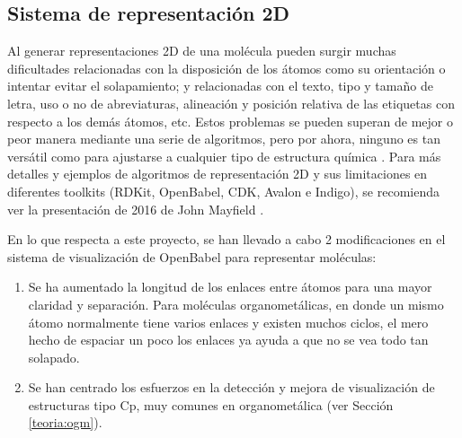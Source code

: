 \subsection{Sistema de representación 2D} \label{implementacion:dibujado}

Al generar representaciones 2D de una molécula pueden surgir muchas dificultades relacionadas con la disposición de los átomos como su orientación o intentar evitar el solapamiento; y relacionadas con el texto, tipo y tamaño de letra, uso o no de abreviaturas, alineación y posición relativa de las etiquetas con respecto a los demás átomos, etc. Estos problemas se pueden superan de mejor o peor manera mediante una serie de algoritmos, pero por ahora, ninguno es tan versátil como para ajustarse a cualquier tipo de estructura química \cite{david_molecular_2020}. Para más detalles y ejemplos de algoritmos de representación 2D y sus limitaciones en diferentes toolkits (RDKit, OpenBabel, CDK, Avalon e Indigo), se recomienda ver la presentación de 2016 de John Mayfield \cite{comparative_depictions}.

En lo que respecta a este proyecto, se han llevado a cabo 2 modificaciones en el sistema de visualización de OpenBabel para representar moléculas:
\begin{enumerate}
    \item Se ha aumentado la longitud de los enlaces entre átomos para una mayor claridad y separación. Para moléculas organometálicas, en donde un mismo átomo normalmente tiene varios enlaces y existen muchos ciclos, el mero hecho de espaciar un poco los enlaces ya ayuda a que no se vea todo tan solapado.
    \item Se han centrado los esfuerzos en la detección y mejora de visualización de estructuras tipo Cp, muy comunes en organometálica (ver Sección \ref{teoria:ogm}).
\end{enumerate}


